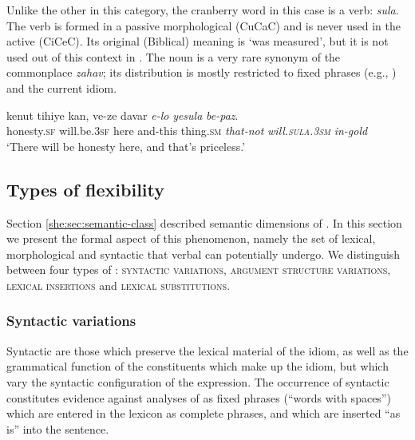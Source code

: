 \documentclass[output=paper]{langsci/langscibook}
\begin{document}
 Unlike the other  in this category, the cranberry word in this case is a verb: \textit{sula}. The verb is formed in a passive morphological  (CuCaC) and is never used in the active  (CiCeC). Its original (Biblical) meaning is `was measured', but it is not used out of this context in . The noun  is a very rare synonym of the commonplace \textit{zahav}; its distribution is mostly restricted to fixed phrases (e.g., ) and the current idiom.

	\ea\label{she:yesula-canon}
    	\gll kenut tihiye kan, ve-ze davar \textit{{\shin}e-lo} \textit{yesula} \textit{be-paz}.\\
    	   honesty.\textsc{sf} will.be.\textsc{3sf} here and-this thing.\textsc{sm} \textit{that-not} \textit{will.\textsc{sula}.\textsc{3sm}} \textit{in-gold}\\
    	\glt `There will be honesty here, and that's priceless.'
	\z


\subsection{Types of flexibility}

Section \ref{she:sec:semantic-class} described semantic dimensions of . In this section we present the formal aspect of this phenomenon, namely the set of lexical, morphological and syntactic  that verbal  can potentially undergo. We distinguish between four types of : {\scshape syntactic variations}, {\scshape argument structure variations}, {\scshape lexical insertions} and {\scshape lexical substitutions}.

\subsubsection{Syntactic variations}
\label{she:sec:syn-var}
Syntactic  are those which preserve the lexical material of the idiom, as well as the grammatical function of the constituents which make up the idiom, but which vary the syntactic configuration of the expression. The occurrence of syntactic  constitutes evidence against analyses of  as fixed phrases (``words with spaces'') which are entered in the lexicon as complete phrases, and which are inserted ``as is'' into the sentence.
\end{document}
